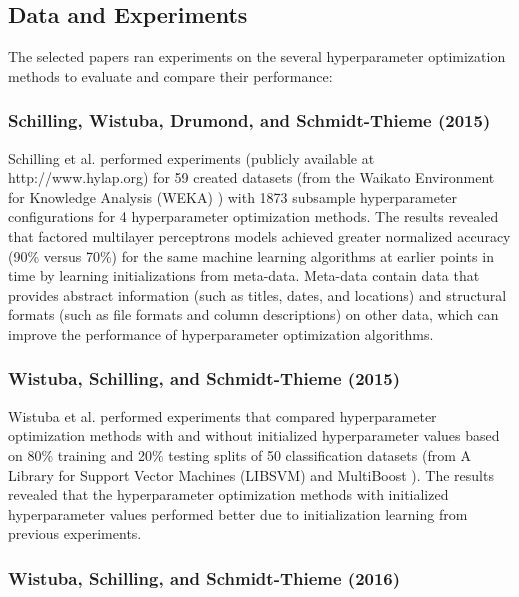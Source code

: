 \subsection{Data and Experiments} \label{data-and-experiments}

The selected papers ran experiments on the several hyperparameter optimization methods to evaluate and compare their performance:

\subsubsection{Schilling, Wistuba, Drumond, and Schmidt-Thieme (2015)} \label{schilling-2015}

Schilling et al. \cite{Schilling:2015} performed experiments (publicly available at http://www.hylap.org) for 59 created datasets (from the Waikato Environment for Knowledge Analysis (WEKA) \cite{Hall:2009}) with 1873 subsample hyperparameter configurations for 4 hyperparameter optimization methods. The results revealed that factored multilayer perceptrons models achieved greater normalized accuracy (90\% versus 70\%) for the same machine learning algorithms at earlier points in time by learning initializations from meta-data. Meta-data contain data that provides abstract information (such as titles, dates, and locations) and structural formats (such as file formats and column descriptions) on other data, which can improve the performance of hyperparameter optimization algorithms.

\subsubsection{Wistuba, Schilling, and Schmidt-Thieme (2015)} \label{wistuba-2015}

Wistuba et al. \cite{Wistuba:2015} performed experiments that compared hyperparameter optimization methods with and without initialized hyperparameter values based on 80\% training and 20\% testing splits of 50 classification datasets (from A Library for Support Vector Machines (LIBSVM) \cite{Chang:2011} and MultiBoost \cite{Benbouzid:2012}). The results revealed that the hyperparameter optimization methods with initialized hyperparameter values performed better due to initialization learning from previous experiments.

\subsubsection{Wistuba, Schilling, and Schmidt-Thieme (2016)} \label{wistuba-2016}

